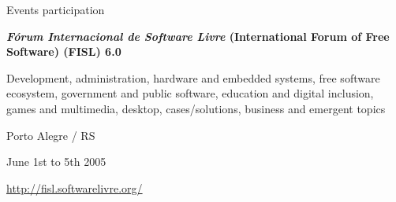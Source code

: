 \begin {rubric} {Events participation}














\entry*
\textbf {\emph{Fórum Internacional de Software Livre} (International Forum of Free
  Software) (FISL) 6.0}

Development, administration, hardware and embedded systems, free software ecosystem, government and public software, education and digital inclusion, games and multimedia, desktop, cases/solutions, business and emergent topics

Porto Alegre / RS

June 1st to 5th 2005

\url {http://fisl.softwarelivre.org/}







\end{rubric}
